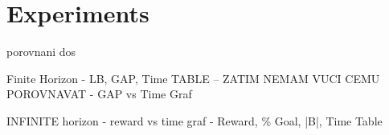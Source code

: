 

\chapter{Experiments}


porovnani dos


Finite Horizon - LB, GAP, Time TABLE -- ZATIM NEMAM VUCI CEMU POROVNAVAT
                - GAP vs Time Graf
                
INFINITE horizon - reward vs time graf
                - Reward, \% Goal, |B|, Time Table